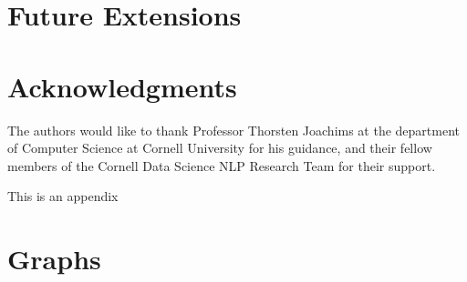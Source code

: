 \documentclass{vldb}
\begin{document}
\section{Future Extensions}

\section{Acknowledgments}
The authors would like to thank Professor Thorsten Joachims at the department of Computer Science at Cornell University for his guidance, and their fellow members of the Cornell Data Science NLP Research Team for their support.


  



\begin{appendix}
This is an appendix

\section{Graphs}

\end{appendix}
\end{document}
